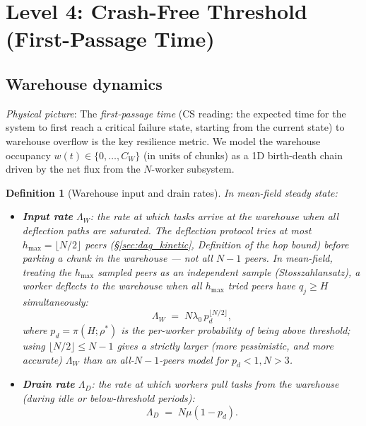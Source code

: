 \documentclass[11pt,a4paper]{article}
\newtheorem{definition}{Definition}[section]
\newcommand{\rhostar}{\rho^{*}}
\newcommand{\lambdazero}{\lambda_0}
\newcommand{\pd}{p_d}
\begin{document}
\section{Level 4: Crash-Free Threshold (First-Passage Time)}

\subsection{Warehouse dynamics}

\emph{Physical picture}:
The \emph{first-passage time} (CS reading: the expected time for the system
to first reach a critical failure state, starting from the current state)
to warehouse overflow is the key resilience metric.
We model the warehouse occupancy $w(t) \in \{0, \ldots, C_W\}$
(in units of chunks) as a 1D birth-death chain driven by the net flux
from the $N$-worker subsystem.

\begin{definition}[Warehouse input and drain rates]
\label{def:warehouse-rates}
In mean-field steady state:
\begin{itemize}
  \item \textbf{Input rate} $\Lambda_W$: the rate at which tasks arrive
        at the warehouse when all deflection paths are saturated. The
        deflection protocol tries at most $h_{\max} = \lfloor N/2\rfloor$
        peers (\S\ref{sec:dag_kinetic}, Definition of the hop bound) before
        parking a chunk in the warehouse --- \emph{not} all $N-1$ peers.
        In mean-field, treating the $h_{\max}$ sampled peers as an
        independent sample (Stosszahlansatz), a worker deflects to the
        warehouse when all $h_{\max}$ tried peers have $q_j \geq H$
        simultaneously:
        \begin{equation}
          \Lambda_W \;=\; N\lambdazero\, \pd^{\lfloor N/2\rfloor},
          \label{eq:wh-input}
        \end{equation}
        where $\pd = \pi(H;\rhostar)$ is the per-worker probability of
        being above threshold; using $\lfloor N/2\rfloor \le N-1$ gives a
        strictly larger (more pessimistic, and more accurate) $\Lambda_W$
        than an all-$N-1$-peers model for $\pd<1,N>3$.
  \item \textbf{Drain rate} $\Lambda_D$: the rate at which workers pull
        tasks from the warehouse (during idle or below-threshold periods):
        \begin{equation}
          \Lambda_D \;=\; N\mu(1 - \pd).
          \label{eq:wh-drain}
        \end{equation}
\end{itemize}
\end{definition}
\end{document}
